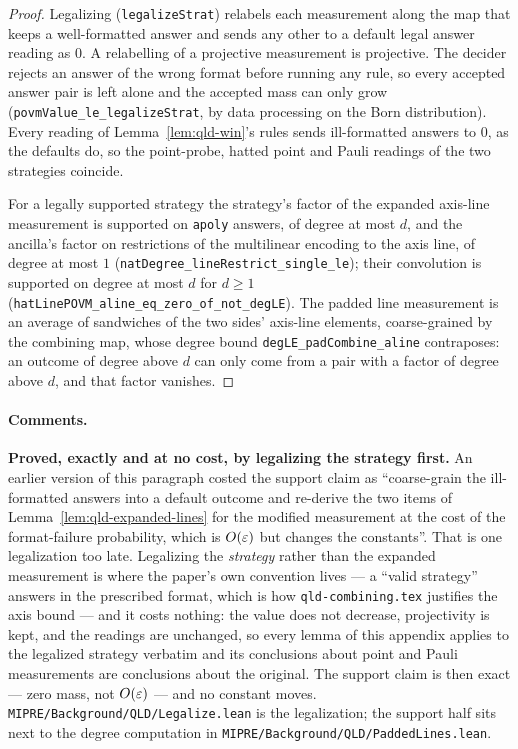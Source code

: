 \begin{proof}
\leanok
Legalizing (\texttt{legalizeStrat}) relabels each measurement along the map that keeps a
well-formatted answer and sends any other to a default legal answer reading as $0$. A
relabelling of a projective measurement is projective. The decider rejects an answer of the wrong
format before running any rule, so every accepted answer pair is left alone and the accepted
mass can only grow (\texttt{povmValue\_le\_legalizeStrat}, by data processing on the Born
distribution). Every reading of Lemma~\ref{lem:qld-win}'s rules sends ill-formatted answers to
$0$, as the defaults do, so the point-probe, hatted point and Pauli readings of the two strategies
coincide.

For a legally supported strategy the strategy's factor of the expanded axis-line measurement is
supported on \texttt{apoly} answers, of degree at most $d$, and the ancilla's factor on
restrictions of the multilinear encoding to the axis line, of degree at most $1$
(\texttt{natDegree\_lineRestrict\_single\_le}); their convolution is supported on degree at most
$d$ for $d \geq 1$ (\texttt{hatLinePOVM\_aline\_eq\_zero\_of\_not\_degLE}). The padded line
measurement is an average of sandwiches of the two sides' axis-line elements, coarse-grained by
the combining map, whose degree bound \texttt{degLE\_padCombine\_aline} contraposes: an outcome
of degree above $d$ can only come from a pair with a factor of degree above $d$, and that factor
vanishes.
\end{proof}

\paragraph{Comments.} \textbf{Proved, exactly and at no cost, by legalizing the strategy first.}
An earlier version of this paragraph costed the support claim as ``coarse-grain the ill-formatted
answers into a default outcome and re-derive the two items of Lemma~\ref{lem:qld-expanded-lines}
for the modified measurement at the cost of the format-failure probability, which is $O(\varepsilon)$ but
changes the constants''. That is one legalization too late. Legalizing the \emph{strategy} rather
than the expanded measurement is where the paper's own convention lives --- a ``valid strategy''
answers in the prescribed format, which is how \texttt{qld-combining.tex} justifies the axis
bound --- and it costs nothing: the value does not decrease, projectivity is kept, and the
readings are unchanged, so every lemma of this appendix applies to the legalized strategy verbatim
and its conclusions about point and Pauli measurements are conclusions about the original. The
support claim is then exact --- zero mass, not $O(\varepsilon)$ --- and no constant moves.
\texttt{MIPRE/Background/QLD/Legalize.lean} is the legalization; the support half sits next to
the degree computation in \texttt{MIPRE/Background/QLD/PaddedLines.lean}.

